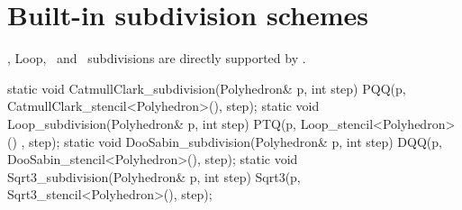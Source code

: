 




\section{Built-in subdivision schemes}
\CC , Loop, \DS\ and \ subdivisions are directly supported 
by . 

\begin{ccExampleCode}
  static void CatmullClark_subdivision(Polyhedron& p, int step) {
    PQQ(p, CatmullClark_stencil<Polyhedron>(), step);
  }
  static void Loop_subdivision(Polyhedron& p, int step) {
    PTQ(p, Loop_stencil<Polyhedron>() , step);
  }
  static void DooSabin_subdivision(Polyhedron& p, int step) {
    DQQ(p, DooSabin_stencil<Polyhedron>(), step);
  }
  static void Sqrt3_subdivision(Polyhedron& p, int step) {
    Sqrt3(p, Sqrt3_stencil<Polyhedron>(), step);
  }
\end{ccExampleCode}

